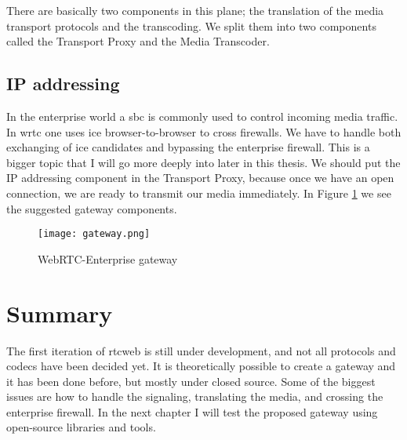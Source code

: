 There are basically two components in this plane; the translation of the media transport protocols and the transcoding. We split them into two components called the Transport Proxy and the Media Transcoder.

\subsection{IP addressing}
In the enterprise world a \gls{sbc} is commonly used to control incoming media traffic. In \gls{wrtc} one uses \gls{ice} browser-to-browser to cross firewalls. We have to handle both exchanging of \gls{ice} candidates and bypassing the enterprise firewall. This is a bigger topic that I will go more deeply into later in this thesis. We should put the IP addressing component in the Transport Proxy, because once we have an open connection, we are ready to transmit our media immediately. In Figure \ref{fig:gateway} we see the suggested gateway components.

\begin{figure}[here]
\centerline{\texttt{[image: gateway.png]}}
\caption{WebRTC-Enterprise gateway}
\label{fig:gateway}
\end{figure}

\section{Summary}
The first iteration of \gls{rtcweb} is still under development, and not all protocols and codecs have been decided yet. It is theoretically possible to create a gateway and it has been done before, but mostly under closed source. Some of the biggest issues are how to handle the signaling, translating the media, and crossing the enterprise firewall. In the next chapter I will test the proposed gateway using open-source libraries and tools.
